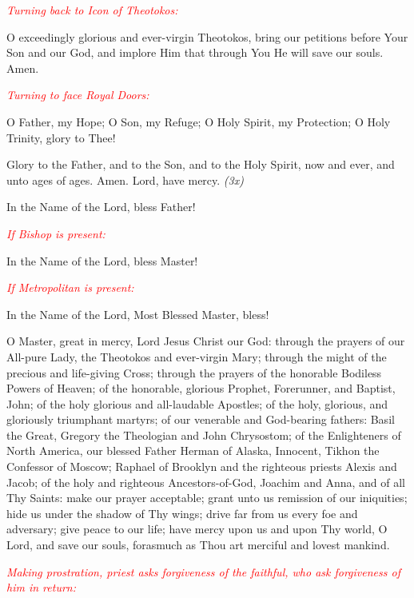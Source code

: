 \textcolor{red}{\textit{Turning back to Icon of Theotokos:}}

\begin{hang}
\noindent\makebox[\indt][l]{}O exceedingly glorious and ever-virgin Theotokos, bring our petitions before Your Son and our God, and implore Him that through You He will save our souls.  Amen.
\end{hang}

\textcolor{red}{\textit{Turning to face Royal Doors:}}

\begin{hang}
\noindent\makebox[\indt][l]{}O Father, my Hope;  O Son, my Refuge;  O Holy Spirit, my Protection;  O Holy Trinity, glory to Thee!

\end{hang}

\begin{hang}
\noindent{}Glory to the Father, and to the Son, and to the Holy Spirit, now and ever, and unto ages of ages.  Amen. Lord, have mercy. \textit{(3x)}

In the Name of the Lord, bless Father!

\textcolor{red}{\textit{If Bishop is present:}}

In the Name of the Lord, bless Master!

\textcolor{red}{\textit{If Metropolitan is present:}}

In the Name of the Lord, Most Blessed Master, bless!

\end{hang}

\begin{hang}
\noindent{}O Master, great in mercy, Lord Jesus Christ our God: through the prayers of our All-pure Lady, the Theotokos and ever-virgin Mary; through the might of the precious and life-giving Cross; through the prayers of the honorable Bodiless Powers of Heaven; of the honorable, glorious Prophet, Forerunner, and Baptist, John; of the holy glorious and all-laudable Apostles; of the holy, glorious, and gloriously triumphant martyrs; of our venerable and God-bearing fathers: Basil the Great, Gregory the Theologian and John Chrysostom; of the Enlighteners of North America, our blessed Father Herman of Alaska, Innocent, Tikhon the Confessor of Moscow; Raphael of Brooklyn and the righteous priests Alexis and Jacob; of the holy and righteous Ancestors-of-God, Joachim and Anna, and of all Thy Saints: make our prayer acceptable;  grant unto us remission of our iniquities;  hide us under the shadow of Thy wings;  drive far from us every foe and adversary; give peace to our life;  have mercy upon us and upon Thy world, O Lord, and save our souls, forasmuch as Thou art merciful and lovest mankind.

\end{hang}
\noindent
\textcolor{red}{\textit{Making prostration, priest asks forgiveness of the faithful, who ask forgiveness of him in return:}}

